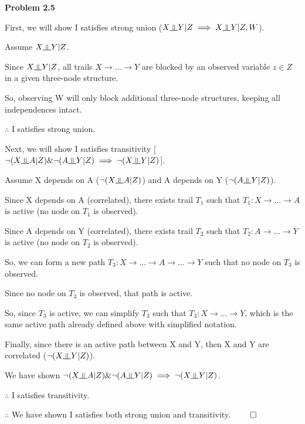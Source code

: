 \documentclass[12pt]{article}
\newcommand{\indep}{\rotatebox[origin=c]{90}{$\models$}}
\begin{document}
\pagebreak\textbf{Problem 2.5}

First, we will show I satisfies strong union ($X \indep Y \vert Z \implies X \indep Y \vert Z, W$).

Assume $X \indep Y \vert Z$.

Since $X \indep Y \vert Z$, all trails $X \rightarrow \dots \rightarrow Y$ are blocked by an observed variable $z \in Z$ in a given three-node structure.

So, observing W will only block additional three-node structures, keeping all independences intact.

$\therefore$ I satisfies strong union.

Next, we will show I satisfies transitivity [$\neg(X \indep A \vert Z) \& \neg(A \indep Y \vert Z) \implies \neg(X \indep Y \vert Z)$].

Assume X depends on A ($\neg(X \indep A \vert Z)$) and A depends on Y ($\neg(A \indep Y \vert Z)$).

Since X depends on A (correlated), there exists trail $T_1$ such that $T_1 : X \rightarrow \dots \rightarrow A$ is active (no node on $T_1$ is observed).

Since A depends on Y (correlated), there exists trail $T_2$ such that $T_2 : A \rightarrow \dots \rightarrow Y$ is active (no node on $T_2$ is observed).

So, we can form a new path $T_3 : X \rightarrow \dots \rightarrow A \rightarrow \dots \rightarrow Y$ such that no node on $T_3$ is observed.

Since no node on $T_3$ is observed, that path is active.

So, since $T_3$ is active, we can simplify $T_3$ such that $T_3 : X \rightarrow \dots \rightarrow Y$, which is the same active path already defined above with simplified notation.

Finally, since there is an active path between X and Y, then X and Y are correlated ($\neg(X \indep Y \vert Z)$).

We have shown $\neg(X \indep A \vert Z) \& \neg(A \indep Y \vert Z) \implies \neg(X \indep Y \vert Z)$. 

$\therefore$ I satisfies transitivity.

$\therefore$ We have shown I satisfies both strong union and transitivity. $\qed$
\end{document}
